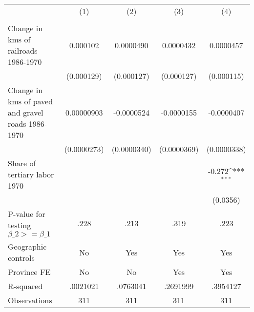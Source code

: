 {
\def\sym#1{\ifmmode^{#1}\else\(^{#1}\)\fi}
\begin{tabular}{l*{4}{c}}
\hline\hline
                &\multicolumn{1}{c}{(1)}&\multicolumn{1}{c}{(2)}&\multicolumn{1}{c}{(3)}&\multicolumn{1}{c}{(4)}\\
                &\multicolumn{1}{c}{}&\multicolumn{1}{c}{}&\multicolumn{1}{c}{}&\multicolumn{1}{c}{}\\
\hline
Change in kms of railroads 1986-1970& 0.000102         &0.0000490         &0.0000432         &0.0000457         \\
                &(0.000129)         &(0.000127)         &(0.000127)         &(0.000115)         \\
[1em]
Change in kms of paved and gravel roads 1986-1970&0.00000903         &-0.0000524         &-0.0000155         &-0.0000407         \\
                &(0.0000273)         &(0.0000340)         &(0.0000369)         &(0.0000338)         \\
[1em]
Share of tertiary labor 1970&                  &                  &                  &   -0.272\sym{***}\\
                &                  &                  &                  & (0.0356)         \\
\hline
P-value for testing $\beta\_{2} >= \beta\_{1}$&     .228         &     .213         &     .319         &     .223         \\
Geographic controls&       No         &      Yes         &      Yes         &      Yes         \\
Province FE     &       No         &       No         &      Yes         &      Yes         \\
R-squared       & .0021021         & .0763041         & .2691999         & .3954127         \\
Observations    &      311         &      311         &      311         &      311         \\
\hline\hline
\end{tabular}
}
